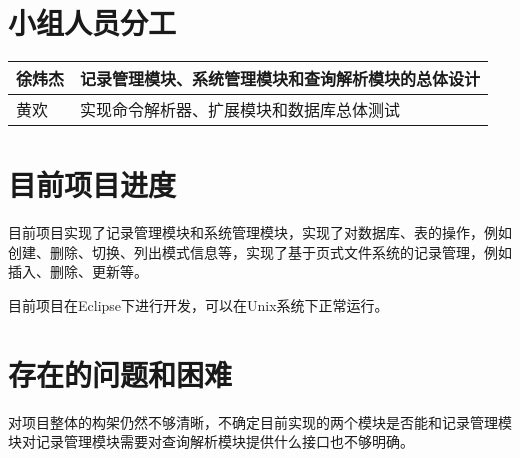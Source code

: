 \section{小组人员分工}
\begin{tabular}{|l|l|}
\hline
徐炜杰 & 记录管理模块、系统管理模块和查询解析模块的总体设计\\
\hline
黄欢 & 实现命令解析器、扩展模块和数据库总体测试\\
\hline
\end{tabular}
\section{目前项目进度}
目前项目实现了记录管理模块和系统管理模块，实现了对数据库、表的操作，例如创建、删除、切换、列出模式信息等，实现了基于页式文件系统的记录管理，例如插入、删除、更新等。

目前项目在Eclipse下进行开发，可以在Unix系统下正常运行。
\section{存在的问题和困难}
对项目整体的构架仍然不够清晰，不确定目前实现的两个模块是否能和记录管理模块对记录管理模块需要对查询解析模块提供什么接口也不够明确。
